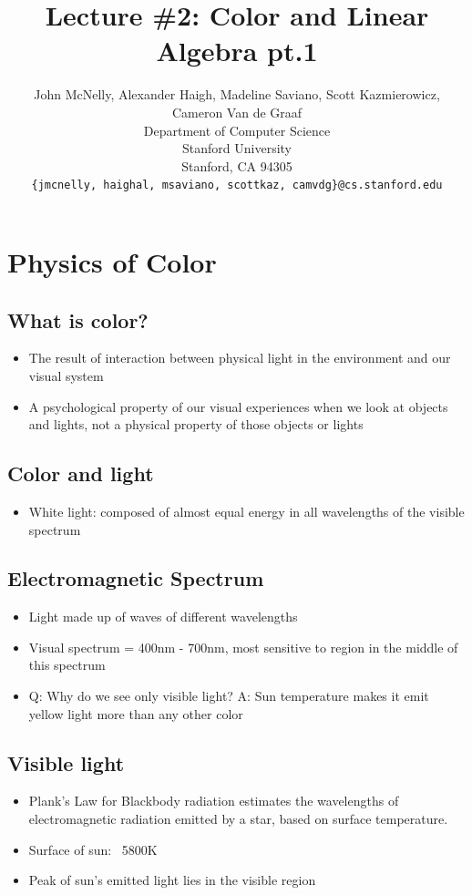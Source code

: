 \documentclass{article}
\title{Lecture \#2: Color and Linear Algebra pt.1}
\author{
  John McNelly, Alexander Haigh, Madeline Saviano, Scott Kazmierowicz, Cameron Van de Graaf \\
  Department of Computer Science\\
  Stanford University\\
  Stanford, CA 94305 \\
  \texttt{\{jmcnelly, haighal, msaviano, scottkaz, camvdg\}@cs.stanford.edu} \\
}
\begin{document}
\maketitle

\section{Physics of Color}
\subsection{What is color?}
\begin{itemize}
	\item The result of interaction between physical light in the environment and our visual system
    \item A psychological property of our visual experiences when we look at objects and lights, not a physical property of those objects or lights
    ~\cite{palmer1999vision}
\end{itemize}

\subsection{Color and light}
\begin{itemize}
	\item White light: composed of almost equal energy in all wavelengths of the visible spectrum
\end{itemize}

\subsection{Electromagnetic Spectrum}
\begin{itemize}
	\item Light made up of waves of different wavelengths
    \item Visual spectrum = 400nm - 700nm, most sensitive to region in the middle of this spectrum
    \item Q: Why do we see only visible light? A: Sun temperature makes it emit yellow light more than any other color
\end{itemize}

\subsection{Visible light}
\begin{itemize}
	\item Plank's Law for Blackbody radiation estimates the wavelengths of electromagnetic radiation emitted by a star, based on surface temperature.
    \item Surface of sun: ~5800K
    \item Peak of sun's emitted light lies in the visible region
\end{itemize}
\end{document}

